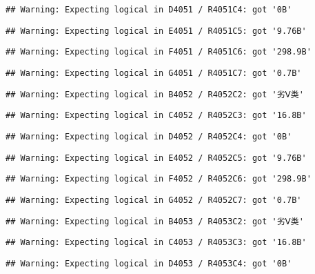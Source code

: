 \documentclass[
]{article}
\begin{document}
\begin{verbatim}
## Warning: Expecting logical in D4051 / R4051C4: got '0B'
\end{verbatim}

\begin{verbatim}
## Warning: Expecting logical in E4051 / R4051C5: got '9.76B'
\end{verbatim}

\begin{verbatim}
## Warning: Expecting logical in F4051 / R4051C6: got '298.9B'
\end{verbatim}

\begin{verbatim}
## Warning: Expecting logical in G4051 / R4051C7: got '0.7B'
\end{verbatim}

\begin{verbatim}
## Warning: Expecting logical in B4052 / R4052C2: got '劣Ⅴ类'
\end{verbatim}

\begin{verbatim}
## Warning: Expecting logical in C4052 / R4052C3: got '16.8B'
\end{verbatim}

\begin{verbatim}
## Warning: Expecting logical in D4052 / R4052C4: got '0B'
\end{verbatim}

\begin{verbatim}
## Warning: Expecting logical in E4052 / R4052C5: got '9.76B'
\end{verbatim}

\begin{verbatim}
## Warning: Expecting logical in F4052 / R4052C6: got '298.9B'
\end{verbatim}

\begin{verbatim}
## Warning: Expecting logical in G4052 / R4052C7: got '0.7B'
\end{verbatim}

\begin{verbatim}
## Warning: Expecting logical in B4053 / R4053C2: got '劣Ⅴ类'
\end{verbatim}

\begin{verbatim}
## Warning: Expecting logical in C4053 / R4053C3: got '16.8B'
\end{verbatim}

\begin{verbatim}
## Warning: Expecting logical in D4053 / R4053C4: got '0B'
\end{verbatim}
\end{document}
